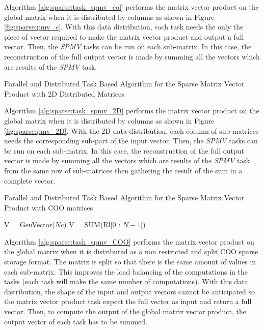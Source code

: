 Algorithm \ref{alg:sparse:task_spmv_col} performs the matrix vector product on the global matrix when it is distributed by columns as shown in Figure \ref{fig:sparse:pmv_c}.
With this data distribution, each task needs the only the piece of vector required to make the matrix vector product and output a full vector.
Then, the \textit{SPMV} tasks can be run on each sub-matrix.
In this case, the reconstruction of the full output vector is made by summing all the vectors which are results of the \textit{SPMV} task.


\begin{algorithm}[h]
	\DontPrintSemicolon
	\caption{Parallel and Distributed Task Based Algorithm for the Sparse  Matrix Vector Product with 2D Distributed Matrices \label{alg:sparse:task_spmv_2D}}
	\;
	\;
\end{algorithm}

Algorithm \ref{alg:sparse:task_spmv_2D} performs the matrix vector product on the global matrix when it is distributed by columns as shown in Figure \ref{fig:sparse:pmv_2D}.
With the 2D data distribution, each column of sub-matrices needs the corresponding sub-part of the input vector.
Then, the \textit{SPMV} tasks can be run on each sub-matrix.
In this case, the reconstruction of the full output vector is made by summing all the vectors which are results of the \textit{SPMV} task from the same row of sub-matrices then gathering the result of the sum in a complete vector.

\begin{algorithm}[h]
	\DontPrintSemicolon
	\caption{Parallel and Distributed Task Based Algorithm for the Sparse  Matrix Vector Product with COO matrices \label{alg:sparse:task_spmv_COO}}
	V = GenVector($Nc$)\;
	\;
	\;
	V = SUM(Rl[0 : $N - 1$])\;
\end{algorithm}

Algorithm \ref{alg:sparse:task_spmv_COO} performs the matrix vector product on the global matrix when it is distributed as a non restricted and split COO sparse storage format.
The matrix is split so that there is the same amount of values in each sub-matrix.
This improves the load balancing of the computations in the tasks (each task will make the same number of computations).
With this data distribution, the shape of the input and output vectors cannot be anticipated so the matrix vector product task expect the full vector as input and return a full vector.
Then, to compute the output of the global matrix vector product, the output vector of each task has to be summed.

